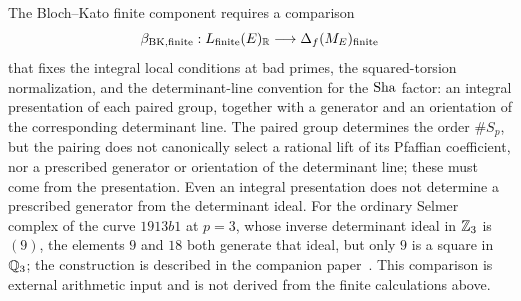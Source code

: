 \begin{obligation}\label{obl:apparatus:rho-finite-transport}
The Bloch--Kato finite component requires a comparison
\[
  \beta_{\mathrm{BK,finite}}:
  L_{\mathrm{finite}}(E)_{\mathbb{R}}
  \longrightarrow
  \Delta_f(M_E)_{\mathrm{finite}}
\]
that fixes the integral local conditions at bad primes, the
squared-torsion normalization, and the determinant-line convention for
the $\operatorname{Sha}$ factor: an integral presentation of each paired group,
together with a generator and an orientation of the corresponding
determinant line.  The paired group determines the order $\#S_p$, but the
pairing does not canonically select a rational lift of its Pfaffian
coefficient, nor a prescribed generator or orientation of the determinant
line; these must come from the presentation.  Even an integral
presentation does not determine a prescribed generator from the
determinant ideal.  For the ordinary Selmer complex of the curve $1913b1$
at $p=3$, whose inverse determinant ideal in $\mathbb{Z}_3$ is $(9)$, the
elements $9$ and $18$ both generate that ideal, but only $9$ is a square
in $\mathbb{Q}_3$; the construction is described in the companion
paper~\citep{TsiokosBSDClosure2026}.  This comparison is external
arithmetic input and is not derived from the finite calculations above.
\end{obligation}
